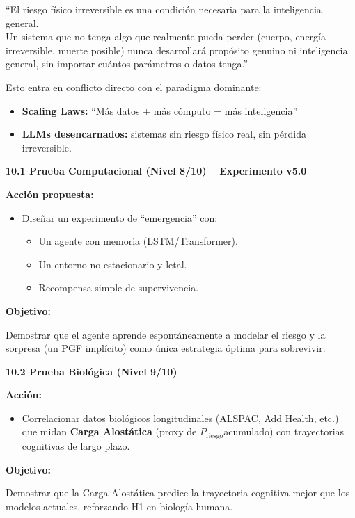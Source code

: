 ``El riesgo físico irreversible es una condición necesaria para la
inteligencia general.\\
Un sistema que no tenga algo que realmente pueda perder (cuerpo, energía
irreversible, muerte posible) nunca desarrollará propósito genuino ni
inteligencia general, sin importar cuántos parámetros o datos tenga.''

Esto entra en conflicto directo con el paradigma dominante:

\begin{itemize}
\item
  \textbf{Scaling Laws:} ``Más datos + más cómputo = más inteligencia''
\item
  \textbf{LLMs desencarnados:} sistemas sin riesgo físico real, sin
  pérdida irreversible.
\end{itemize}

\textbf{10.1 Prueba Computacional (Nivel 8/10) -- Experimento v5.0}

\textbf{Acción propuesta:}

\begin{itemize}
\item
  Diseñar un experimento de ``emergencia'' con:

  \begin{itemize}
  \item
    Un agente con memoria (LSTM/Transformer).
  \item
    Un entorno no estacionario y letal.
  \item
    Recompensa simple de supervivencia.
  \end{itemize}
\end{itemize}

\textbf{Objetivo:}

Demostrar que el agente aprende espontáneamente a modelar el riesgo y la
sorpresa (un PGF implícito) como única estrategia óptima para
sobrevivir.

\textbf{10.2 Prueba Biológica (Nivel 9/10)}

\textbf{Acción:}

\begin{itemize}
\item
  Correlacionar datos biológicos longitudinales (ALSPAC, Add Health,
  etc.) que midan \textbf{Carga Alostática} (proxy de
  \(P_{\text{riesgo}}\)acumulado) con trayectorias cognitivas de largo
  plazo.
\end{itemize}

\textbf{Objetivo:}

Demostrar que la Carga Alostática predice la trayectoria cognitiva mejor
que los modelos actuales, reforzando H1 en biología humana.

